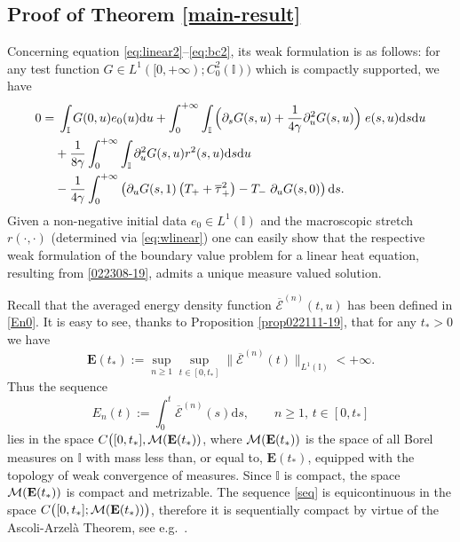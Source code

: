 \documentclass[EJP]{ejpecp} %
\newcommand\T{{\mathbb I}}
\newcommand \ga{\gamma}
\renewcommand{\ge}{\geqslant}
\newcommand{\dd  }{\mathrm{d}}
\renewcommand{\bar}{\overline}
\numberwithin{equation}{section}
\begin{document}
\subsection{Proof of Theorem  \ref{main-result}}

\label{sec13.2.2}
 Concerning equation \eqref{eq:linear2}--\eqref{eq:bc2}, its weak
  formulation is as follows:
for any   test function $G\in L^1([0,+\infty);C_{0}^2(\T))$  which is compactly supported,
we have
\begin{align}
\label{022308-19}
 0= & \;  
 \int_\T  G(0,u) e_0(u)\dd u   +
 \int_0^{+\infty}  \int_\T   \Big(\partial_sG(s,u) + \frac1{4\ga}
    \partial_u^2G(s,u) \Big)\; e(s,u)\dd s\dd u  \notag \\
&
+ \frac {1}{8\ga}\int_0^{+\infty}  \int_\T \partial_u^2 G(s,u)
   r^2(s,u) \dd s \dd u  \notag \\
   & - \frac{1}{4\ga}\int_0^{+\infty}  \left(\partial_uG(s,1) \left( T_+
       + \bar\tau_+^2\right)
     -T_-\;\partial_uG(s,0) \right)\dd s.
  \end{align}
Given a non-negative initial data $e_0\in L^1(\T)$ and
the macroscopic stretch $ r(\cdot,\cdot)$ (determined via \eqref{eq:wlinear}) one can easily
    show that the respective weak formulation of the boundary value
    problem for a linear heat equation, resulting from \eqref{022308-19},
    admits a unique measure valued solution.
 
Recall that the  averaged energy density function $\bar{ \mathcal E}^{(n)}(t,u)$
has been defined in \eqref{En0}. 
It is easy to see, thanks to Proposition \ref{prop022111-19}, that for any $t_*>0$ 
we have
$$
\mathbf{E}(t_*):=\sup_{n\ge1}\sup_{t\in[0,t_*]}\big\|\bar{ \mathcal E}^{(n)}(t)\big\|_{L^1(\T)}<+\infty.
$$
Thus
the sequence
\begin{equation}
\label{seq}
E_n(t):=\int_0^t\bar{ \mathcal E}^{(n)}(s)\dd s,\qquad n\ge1,\,t\in[0,t_*]
\end{equation}
lies in the space $C\big([0,t_*],{\cal M}(\mathbf{E}(t_*))$, where ${\cal M}(\mathbf{E}(t_*))$ is the space of all Borel measures on $\T$ with mass
less than, or equal to, $\mathbf{E}(t_*)$, equipped with the
topology of weak convergence of measures. Since $\T$ is compact, the
space ${\cal M}(\mathbf{E}(t_*))$ is compact and metrizable. The  sequence \eqref{seq} 
is equicontinuous in the space $C\big([0,t_*];{\cal M}(\mathbf{E}(t_*))\big)$, therefore it is sequentially compact by virtue of the Ascoli-Arzel\`a Theorem, see e.g.~\cite[p.~234]{kelley}.  
\end{document}
